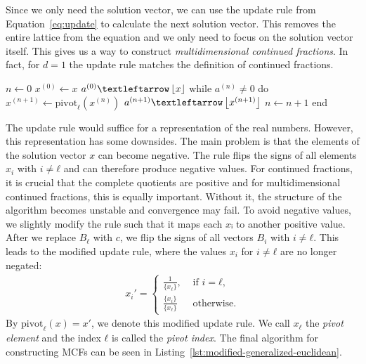 Since we only need the solution vector,
we can use the update rule from Equation~\ref{eq:update}
to calculate the next solution vector.
This removes the entire lattice from the equation
and we only need to focus on the solution vector itself.
This gives us a way to construct \emph{multidimensional continued fractions}.
In fact, for $d = 1$ the update rule matches the definition of continued fractions.


\begin{Pseudocode}[
    float=tbp,
    label={lst:modified-generalized-euclidean},
    caption={
      The algorithm for constructing a multidimensional continued fraction
      based on the generalized Euclidean algorithm.
      It constructs a representation for a vector $x ∈ ℝ^d$
      as a list ${[a^{(0)}; a^{(1)}, …]}$ with $a^{(n)} ∈ ℤ^d$
      using the pivot operation from Equation~\ref{eq:modified-update-rule}.
    }]
$n ← 0$
$x^{(0)} ← x$
$a^{(0)} ← \floor{x}$
while $a^{(n)} ≠ 0$ do
  $x^{(n+1)} ← \mathrm{pivot}_ℓ(x^{(n)})$
  $a^{(n+1)} ← \floor{x^{(n+1)}}$
  $n ← n + 1$
end
\end{Pseudocode}

The update rule would suffice for a representation of the real numbers.
However, this representation has some downsides.
The main problem is that the elements of the solution vector $x$ can become negative.
The rule flips the signs of all elements $x_i$ with $i ≠ ℓ$
and can therefore produce negative values.
For continued fractions, it is crucial that the complete quotients are positive \cite{Northshield11}
and for multidimensional continued fractions, this is equally important.
Without it, the structure of the algorithm becomes unstable and convergence may fail.
To avoid negative values, we slightly modify the rule such that it maps each $xᵢ$ to another positive value.
After we replace $B_ℓ$ with $c$, we flip the signs of all vectors $B_i$ with $i ≠ ℓ$.
This leads to the modified update rule, where the values $x_i$ for $i ≠ ℓ$ are
no longer negated:
\begin{align}
  \label{eq:modified-update-rule}
  x_i' =
  \begin{cases}
    \frac{1}{\{x_ℓ\}},  & \text{ if } i = ℓ, \\
    \frac{\{x_i\}}{\{x_ℓ\}} & \text{ otherwise.}
  \end{cases}
\end{align}
By $\mathrm{pivot}_ℓ(x) = x'$, we denote this modified update rule.
We call $x_ℓ$ the \emph{pivot element} and the index $ℓ$ is called the \emph{pivot index}.
The final algorithm for constructing MCFs can be seen in
Listing~\ref{lst:modified-generalized-euclidean}.

